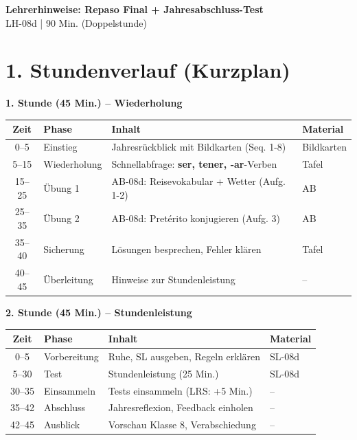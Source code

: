 \documentclass[11pt, a4paper]{article}
\newcommand{\fachfarbe}{spanisch}
\newcommand{\thema}{Repaso Final + Jahresabschluss-Test}
\newcommand{\sequenz}{08}
\newcommand{\block}{d}
\newcommand{\dauer}{90 Min. (Doppelstunde)}
\newcommand{\es}[1]{\textcolor{\fachfarbe}{\textbf{#1}}}
\begin{document}

\begin{center}
    {\Large\bfseries\textcolor{\fachfarbe}{Lehrerhinweise: \thema}}\\[0.3em]
    {\normalsize LH-\sequenz\block{} | \dauer}
\end{center}

\vspace{10pt}


\section*{1. Stundenverlauf (Kurzplan)}

\textbf{1. Stunde (45 Min.) -- Wiederholung}

\begin{tabularx}{\textwidth}{|c|l|X|l|}
\hline
\textbf{Zeit} & \textbf{Phase} & \textbf{Inhalt} & \textbf{Material} \\
\hline
0--5 & Einstieg & Jahresrückblick mit Bildkarten (Seq. 1-8) & Bildkarten \\
\hline
5--15 & Wiederholung & Schnellabfrage: \es{ser, tener, -ar}-Verben & Tafel \\
\hline
15--25 & Übung 1 & AB-08d: Reisevokabular + Wetter (Aufg. 1-2) & AB \\
\hline
25--35 & Übung 2 & AB-08d: Pretérito konjugieren (Aufg. 3) & AB \\
\hline
35--40 & Sicherung & Lösungen besprechen, Fehler klären & Tafel \\
\hline
40--45 & Überleitung & Hinweise zur Stundenleistung & -- \\
\hline
\end{tabularx}

\vspace{1em}

\textbf{2. Stunde (45 Min.) -- Stundenleistung}

\begin{tabularx}{\textwidth}{|c|l|X|l|}
\hline
\textbf{Zeit} & \textbf{Phase} & \textbf{Inhalt} & \textbf{Material} \\
\hline
0--5 & Vorbereitung & Ruhe, SL ausgeben, Regeln erklären & SL-08d \\
\hline
5--30 & Test & Stundenleistung (25 Min.) & SL-08d \\
\hline
30--35 & Einsammeln & Tests einsammeln (LRS: +5 Min.) & -- \\
\hline
35--42 & Abschluss & Jahresreflexion, Feedback einholen & -- \\
\hline
42--45 & Ausblick & Vorschau Klasse 8, Verabschiedung & -- \\
\hline
\end{tabularx}
\end{document}
